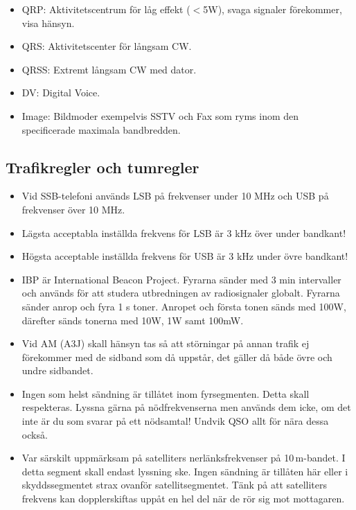 \begin{itemize}
\item QRP: Aktivitetscentrum för låg effekt ($<$5W), svaga signaler
      förekommer, visa hänsyn.
\item QRS: Aktivitetscenter för långsam CW.
\item QRSS: Extremt långsam CW med dator.
\item DV: Digital Voice.
\item Image: Bildmoder exempelvis SSTV och Fax som ryms inom den specificerade
	  maximala bandbredden.
\end{itemize}

\subsection{Trafikregler och tumregler}

\begin{itemize}
\item Vid SSB-telefoni används LSB på frekvenser under 10 MHz och USB
      på frekvenser över 10 MHz.
\item Lägsta acceptabla inställda frekvens för LSB är 3 kHz över
      under bandkant!
\item Högsta acceptable inställda frekvens för USB är 3 kHz under
      övre bandkant!
\item IBP är International Beacon Project. Fyrarna sänder med 3 min
      intervaller och används för att studera utbredningen av
      radiosignaler globalt. Fyrarna sänder anrop och fyra 1 s toner.
      Anropet och första tonen sänds med 100W, därefter sänds tonerna
      med 10W, 1W samt 100mW.
\item Vid AM (A3J) skall hänsyn tas så att störningar på annan trafik ej fö\-re\-kom\-mer
      med de sidband som då uppstår, det gäller då både övre och undre
      sidbandet.
\item Ingen som helst sändning är tillåtet inom fyrsegmenten. Detta skall respekteras.
      Lyssna gärna på nödfrekvenserna men används dem icke, om det
      inte är du som svarar på ett nödsamtal! Undvik QSO allt för nära
      dessa också.
\item Var särskilt uppmärksam på satelliters nerlänksfrekvenser på 10\,m-bandet.
      I detta segment skall endast lyssning ske. Ingen sändning är
      tillåten här eller i skyddssegmentet strax ovanför
      satellitsegmentet. Tänk på att satelliters frekvens kan
      dopplerskiftas uppåt en hel del när de rör sig mot mottagaren.
\end{itemize}

